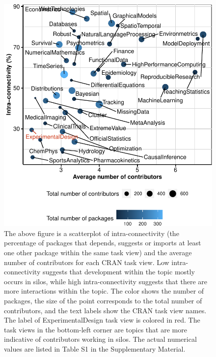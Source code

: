\documentclass{article}
\begin{document}
\begin{figure}[htbp]

{\centering \includegraphics{figures/ctv-summ-plot-1} 

}

\caption{The above figure is a scatterplot of intra-connectivity (the percentage of packages that depends, suggests or imports at least one other package within the same task view) and the average number of contributors for each CRAN task view. Low intra-connectivity suggests that development within the topic mostly occurs in silos, while high  intra-connectivity suggests that there are more interactions within the topic. The color shows the number of packages, the size of the point corresponds to the total number of contributors, and the text labels show the CRAN task view names.  The label of ExperimentalDesign task view is colored in red. The task views in the bottom-left corner are topics that are more indicative of contributors working in silos. The actual numerical values are listed in Table S1 in the Supplementary Material.}\label{fig:ctv-summ-plot}
\end{figure}
\end{document}
